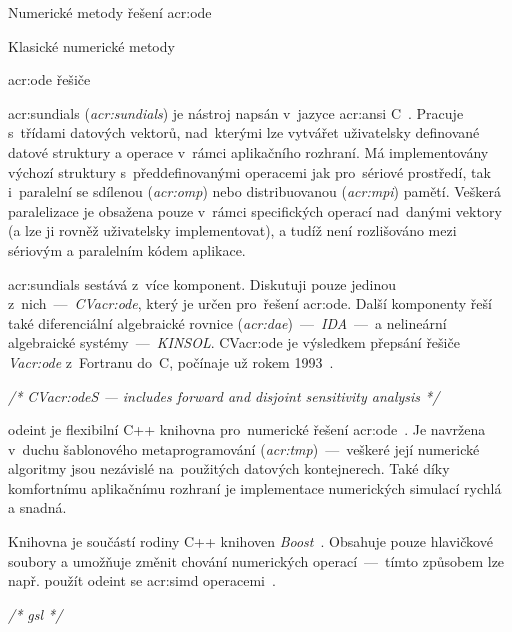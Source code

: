\documentclass[thesis=M,czech]{FITthesis}[2012/06/26]
\newcommand{\acrlabel}[1]{acr:#1}
\newcommand{\acr}[1]{\acrshort{\acrlabel{#1}}}
\newcommand{\acrl}[1]{\acrlong{\acrlabel{#1}}}
\newcommand{\cmt}[1]{\textit{/* #1 */}}
\newcommand{\hl}[1]{\textit{#1}}
\newcommand{\name}[1]{\hl{#1}}
\newcommand{\cit}[1]{\cite{#1}}
\begin{document}
\begin{section}{Numerické metody řešení \acr{ode}}
\begin{subsection}{Klasické numerické metody}
\begin{subsubsection}{\acr{ode} řešiče}
\begin{paragraph}{\acr{sundials}}\label{p:search:ode:classic:solver:sundials}
(\name{\acrl{sundials}}) je nástroj napsán v~jazyce
\acr{ansi} C~\cit{sundials}.
Pracuje s~třídami datových vektorů,
nad~kterými lze vytvářet uživatelsky definované
datové struktury a operace v~rámci aplikačního rozhraní.
Má implementovány výchozí struktury
s~předdefinovanými operacemi
jak pro~sériové prostředí,
tak i~paralelní se sdílenou (\name{\acr{omp}})
nebo distribuovanou (\name{\acr{mpi}}) pamětí.
Veškerá paralelizace je obsažena
pouze v~rámci specifických operací nad~danými vektory
(a lze ji rovněž uživatelsky implementovat),
a tudíž není rozlišováno mezi sériovým a paralelním kódem aplikace.

\acr{sundials} sestává z~více komponent.
Diskutuji pouze jedinou z~nich~---~\name{CV\acr{ode}},
který je určen pro~řešení \acr{ode}.
Další komponenty řeší
také diferenciální algebraické rovnice
(\name{\acr{dae}})~---~\name{IDA}~---~a nelineární
algebraické systémy~---~\name{KINSOL}.
CV\acr{ode} je výsledkem
přepsání řešiče \name{V\acr{ode}} z~Fortranu do~C,
počínaje už rokem 1993~\cit{sundials-art}.

\cmt{CV\acr{ode}S --- includes forward and disjoint sensitivity analysis}
\end{paragraph} %


\begin{paragraph}{odeint}\label{p:search:ode:classic:solver:odeint}
je flexibilní C++ knihovna
pro~numerické řešení \acr{ode}~\cit{odeint}.
Je navržena v~duchu šablonového metaprogramování
(\name{\acr{tmp}})~---~veškeré její numerické algoritmy
jsou nezávislé na~použitých datových kontejnerech.
Také díky komfortnímu aplikačnímu rozhraní
je implementace numerických simulací rychlá a snadná.

Knihovna je součástí rodiny C++ knihoven \name{Boost}~\cit{boost-libs}.
Obsahuje pouze hlavičkové soubory
a umožňuje změnit chování numerických operací~---~tímto způsobem
lze např. použít odeint
se \acr{simd} operacemi~\cit{odeint-art}.

\cmt{gsl}
\end{paragraph} %


\end{subsubsection} %


\end{subsection} %


\end{section}
\end{document}

